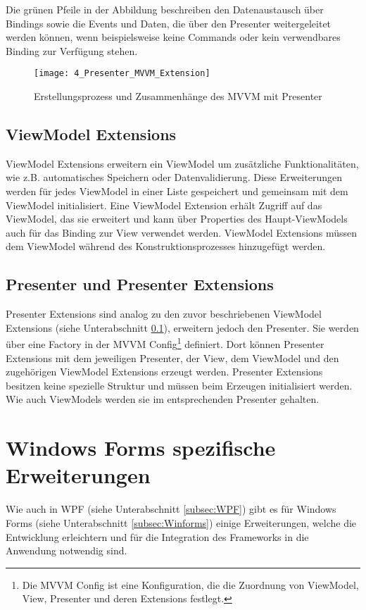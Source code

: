 Die grünen Pfeile in der Abbildung beschreiben den Datenaustausch über Bindings sowie die Events und Daten, die über den Presenter weitergeleitet werden können, wenn beispielsweise keine Commands oder kein verwendbares Binding zur Verfügung stehen.

\begin{figure}[H]
    \centering
    \texttt{[image: 4\_Presenter\_MVVM\_Extension]}
    \caption{Erstellungsprozess und Zusammenhänge des MVVM mit Presenter}
    \label{fig:mvvm_with_presenter}
\end{figure}

\subsection{ViewModel Extensions}
\label{subsec:viewmodel_extensions}
ViewModel Extensions erweitern ein ViewModel um zusätzliche Funktionalitäten, wie z.B. automatisches Speichern oder Datenvalidierung. Diese Erweiterungen werden für jedes ViewModel in einer Liste gespeichert und gemeinsam mit dem ViewModel initialisiert. Eine ViewModel Extension erhält Zugriff auf das ViewModel, das sie erweitert und kann über Properties des Haupt-ViewModels auch für das Binding zur View verwendet werden. ViewModel Extensions müssen dem ViewModel während des Konstruktionsprozesses hinzugefügt werden.

\subsection{Presenter und Presenter Extensions}
\label{subsec:presenter_extensions}
Presenter Extensions sind analog zu den zuvor beschriebenen ViewModel Extensions (siehe Unterabschnitt \ref{subsec:viewmodel_extensions}), erweitern jedoch den Presenter. Sie werden über eine Factory in der MVVM Config\footnote{Die MVVM Config ist eine Konfiguration, die die Zuordnung von ViewModel, View, Presenter und deren Extensions festlegt.} definiert. Dort können Presenter Extensions mit dem jeweiligen Presenter, der View, dem ViewModel und den zugehörigen ViewModel Extensions erzeugt werden. Presenter Extensions besitzen keine spezielle Struktur und müssen beim Erzeugen initialisiert werden. Wie auch ViewModels werden sie im entsprechenden Presenter gehalten.

\section{Windows Forms spezifische Erweiterungen}
\label{sec:mvp_extensions}
Wie auch in WPF (siehe Unterabschnitt \ref{subsec:WPF}) gibt es für Windows Forms (siehe Unterabschnitt \ref{subsec:Winforms}) einige Erweiterungen, welche die Entwicklung erleichtern und für die Integration des Frameworks in die Anwendung notwendig sind.

